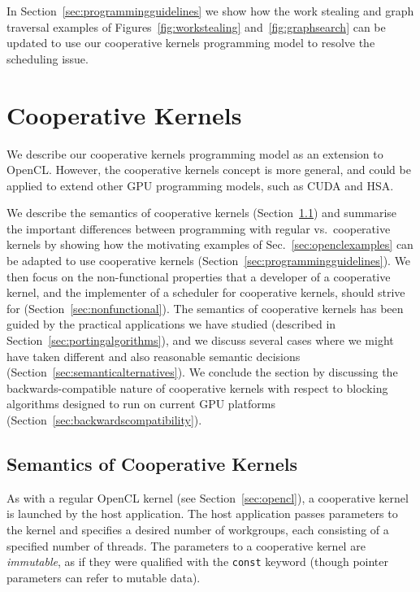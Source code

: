 \documentclass[numbers,nocopyrightspace,10pt]{sigplanconf}
\newcommand{\mysec}{Sec.~}
\begin{document}
In Section~\ref{sec:programmingguidelines} we show how the work stealing
and graph traversal examples of Figures~\ref{fig:workstealing} and~\ref{fig:graphsearch} can be
updated to use our cooperative kernels programming model to resolve
the scheduling issue.





\section{Cooperative Kernels}\label{sec:cooperativekernels}

We describe our cooperative kernels programming model as an extension
to OpenCL.  However, the cooperative kernels concept is more general,
and could be applied to extend other GPU programming models, such as
CUDA and HSA.

We describe the semantics of cooperative kernels
(Section~\ref{sec:semantics}) and summarise the important
differences between programming with regular vs.\ cooperative kernels
by showing how the motivating examples of \mysec\ref{sec:openclexamples} can be adapted to use cooperative kernels
(Section~\ref{sec:programmingguidelines}).
We then focus on the non-functional
properties that a developer of a cooperative kernel, and the
implementer of a scheduler for cooperative kernels, should strive for
(Section~\ref{sec:nonfunctional}).  The semantics of cooperative
kernels has been guided by the practical applications we have studied
(described in Section~\ref{sec:portingalgorithms}), and we discuss several cases where we
might have taken different and also reasonable semantic decisions (Section~\ref{sec:semanticalternatives}).
We conclude the section by discussing the backwards-compatible nature
of cooperative kernels with respect to blocking algorithms designed to
run on current GPU platforms
(Section~\ref{sec:backwardscompatibility}).

\subsection{Semantics of Cooperative Kernels}\label{sec:semantics}

As with a regular OpenCL kernel (see Section~\ref{sec:opencl}), a
cooperative kernel is launched by the host application.  The host
application passes parameters to the kernel and specifies a desired
number of workgroups, each consisting of a specified number of
threads.  The parameters to a cooperative kernel are \emph{immutable}, as if
they were qualified with the \texttt{const} keyword (though pointer
parameters can refer to mutable data).
\end{document}
